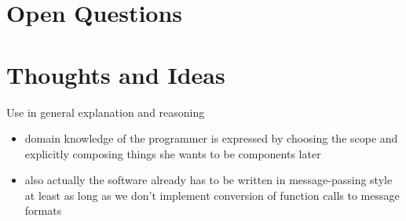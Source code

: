 \documentclass{scrartcl}
\begin{document}
\section{Open Questions}
\section{Thoughts and Ideas}
Use in general explanation and reasoning
\begin{itemize}
    \item domain knowledge of the programmer is expressed by choosing the scope and explicitly composing things she wants to be components later
    \item also actually the software already has to be written in message-passing style at least as long as we don't implement conversion of function calls to message formats
\end{itemize}
\end{document}
